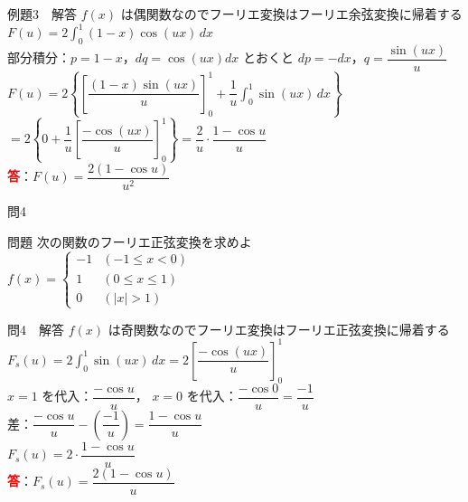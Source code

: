 \documentclass[professionalfonts]{beamer}
\begin{document}
\begin{frame}{例題3　解答}
  $f(x)$ は偶関数なのでフーリエ変換はフーリエ余弦変換に帰着する\\[4pt]
  $F(u) = 2\displaystyle\int_{0}^{1}(1-x)\cos(ux)\,dx$\\[6pt]
  部分積分：$p=1-x$，$dq=\cos(ux)dx$ とおくと $dp=-dx$，$q=\dfrac{\sin(ux)}{u}$\\[4pt]
  $F(u) = 2\!\left\{\!\left[\dfrac{(1-x)\sin(ux)}{u}\right]_{0}^{1}
    + \dfrac{1}{u}\displaystyle\int_{0}^{1}\sin(ux)\,dx\right\}$\\[4pt]
  $= 2\!\left\{0 + \dfrac{1}{u}\!\left[\dfrac{-\cos(ux)}{u}\right]_{0}^{1}\right\}
    = \dfrac{2}{u}\cdot\dfrac{1-\cos u}{u}$
  \\[8pt]\textcolor{red}{\textbf{答}}：$F(u) = \dfrac{2(1-\cos u)}{u^{2}}$
\end{frame}

\begin{frame}{問4　}
  \begin{exampleblock}{問題}
    次の関数のフーリエ正弦変換を求めよ\\[4pt]
    $f(x) = \begin{cases} -1 & (-1 \leq x < 0) \\ 1 & (0 \leq x \leq 1) \\ 0 & (|x| > 1) \end{cases}$
  \end{exampleblock}
\end{frame}

\begin{frame}{問4　解答}
  $f(x)$ は奇関数なのでフーリエ変換はフーリエ正弦変換に帰着する\\[4pt]
  $F_{s}(u) = 2\displaystyle\int_{0}^{1}\sin(ux)\,dx
    = 2\!\left[\dfrac{-\cos(ux)}{u}\right]_{0}^{1}$\\[6pt]
  $x=1$ を代入：$\dfrac{-\cos u}{u}$，
  $x=0$ を代入：$\dfrac{-\cos 0}{u}=\dfrac{-1}{u}$\\[4pt]
  差：$\dfrac{-\cos u}{u}-\!\left(\dfrac{-1}{u}\right)=\dfrac{1-\cos u}{u}$\\[6pt]
  $F_{s}(u) = 2\cdot\dfrac{1-\cos u}{u}$
  \\[8pt]\textcolor{red}{\textbf{答}}：$F_{s}(u) = \dfrac{2(1-\cos u)}{u}$
\end{frame}
\end{document}
